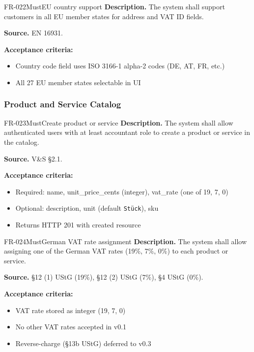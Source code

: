 \documentclass[11pt,a4paper]{article}
\begin{document}
\begin{requirement}{FR-022}{Must}{EU country support}
\textbf{Description.} The system shall support customers in all EU member states for address and VAT ID fields.

\textbf{Source.} EN 16931.

\textbf{Acceptance criteria:}
\begin{itemize}
    \item Country code field uses ISO 3166-1 alpha-2 codes (DE, AT, FR, etc.)
    \item All 27 EU member states selectable in UI
\end{itemize}
\end{requirement}

\subsubsection{Product and Service Catalog}

\begin{requirement}{FR-023}{Must}{Create product or service}
\textbf{Description.} The system shall allow authenticated users with at least accountant role to create a product or service in the catalog.

\textbf{Source.} V\&S \S2.1.

\textbf{Acceptance criteria:}
\begin{itemize}
    \item Required: name, unit\_price\_cents (integer), vat\_rate (one of 19, 7, 0)
    \item Optional: description, unit (default \texttt{St\"uck}), sku
    \item Returns HTTP 201 with created resource
\end{itemize}
\end{requirement}

\begin{requirement}{FR-024}{Must}{German VAT rate assignment}
\textbf{Description.} The system shall allow assigning one of the German VAT rates (19\%, 7\%, 0\%) to each product or service.

\textbf{Source.} \S12 (1) UStG (19\%), \S12 (2) UStG (7\%), \S4 UStG (0\%).

\textbf{Acceptance criteria:}
\begin{itemize}
    \item VAT rate stored as integer (19, 7, 0)
    \item No other VAT rates accepted in v0.1
    \item Reverse-charge (\S13b UStG) deferred to v0.3
\end{itemize}
\end{requirement}
\end{document}
